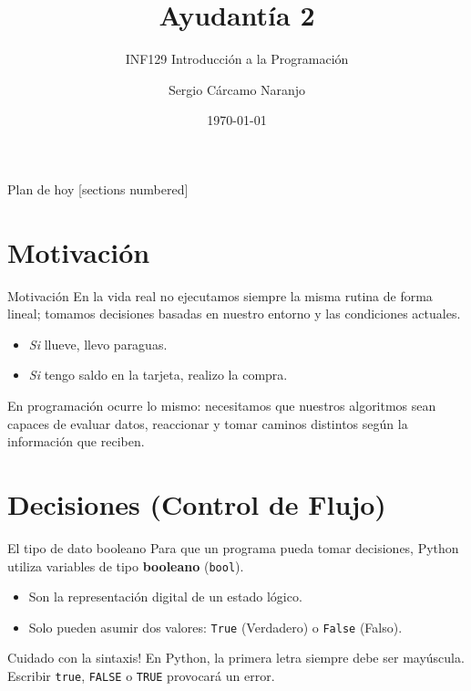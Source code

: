 \documentclass[aspectratio=169, 11pt]{beamer}
\title{Ayudantía 2}
\subtitle{INF129 Introducción a la Programación}
\author{Sergio Cárcamo Naranjo}
\institute{DI - Universidad Técnica Federico Santa María}
\date{\today}
\begin{document}
	
	\maketitle
	
	\begin{frame}{Plan de hoy}
		[sections numbered]
		\tableofcontents[hideallsubsections]
	\end{frame}
	
	
	\section{Motivación}
	
	\begin{frame}{Motivación}
		En la vida real no ejecutamos siempre la misma rutina de forma lineal; tomamos decisiones basadas en nuestro entorno y las condiciones actuales.
		\begin{itemize}
			\item \textit{Si} llueve, llevo paraguas.
			\item \textit{Si} tengo saldo en la tarjeta, realizo la compra.
		\end{itemize}
		\vspace{0.3cm}
		En programación ocurre lo mismo: necesitamos que nuestros algoritmos sean capaces de evaluar datos, reaccionar y tomar caminos distintos según la información que reciben.
	\end{frame}
	
	
	\section{Decisiones (Control de Flujo)}
	
	\begin{frame}{El tipo de dato booleano}
		Para que un programa pueda tomar decisiones, Python utiliza variables de tipo \textbf{booleano} (\texttt{bool}).
		
		\begin{itemize}
			\item Son la representación digital de un estado lógico.
			\item Solo pueden asumir dos valores: \texttt{True} (Verdadero) o \texttt{False} (Falso).
		\end{itemize}
		
		\begin{alertblock}{Cuidado con la sintaxis!} 
			\vspace{0.01cm}
			En Python, la primera letra siempre debe ser mayúscula. Escribir \texttt{true}, \texttt{FALSE} o \texttt{TRUE} provocará un error.
		\end{alertblock}
	\end{frame}
	
\end{document}

